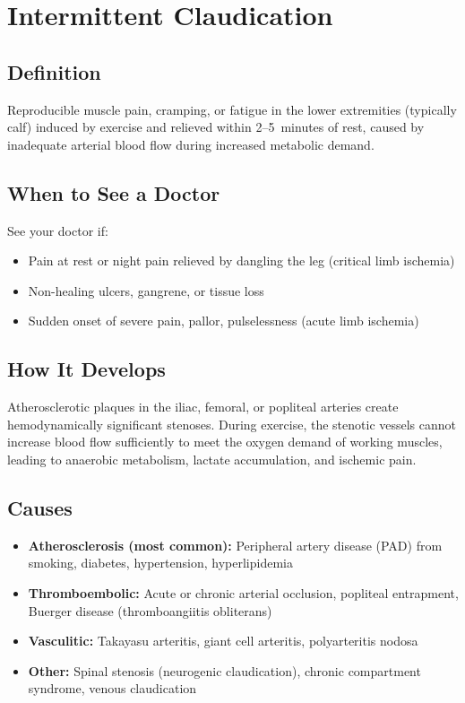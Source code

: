 \chapter{Intermittent Claudication}

\section*{Definition}
Reproducible muscle pain, cramping, or fatigue in the lower extremities (typically calf) induced by exercise and relieved within 2--5~minutes of rest, caused by inadequate arterial blood flow during increased metabolic demand.

\section*{When to See a Doctor}
See your doctor if:
\begin{itemize}
  \item Pain at rest or night pain relieved by dangling the leg (critical limb ischemia)
  \item Non-healing ulcers, gangrene, or tissue loss
  \item Sudden onset of severe pain, pallor, pulselessness (acute limb ischemia)
\end{itemize}

\section*{How It Develops}
Atherosclerotic plaques in the iliac, femoral, or popliteal arteries create hemodynamically significant stenoses. During exercise, the stenotic vessels cannot increase blood flow sufficiently to meet the oxygen demand of working muscles, leading to anaerobic metabolism, lactate accumulation, and ischemic pain.

\section*{Causes}
\begin{itemize}
  \item \textbf{Atherosclerosis (most common):} Peripheral artery disease (PAD) from smoking, diabetes, hypertension, hyperlipidemia
  \item \textbf{Thromboembolic:} Acute or chronic arterial occlusion, popliteal entrapment, Buerger disease (thromboangiitis obliterans)
  \item \textbf{Vasculitic:} Takayasu arteritis, giant cell arteritis, polyarteritis nodosa
  \item \textbf{Other:} Spinal stenosis (neurogenic claudication), chronic compartment syndrome, venous claudication
\end{itemize}

